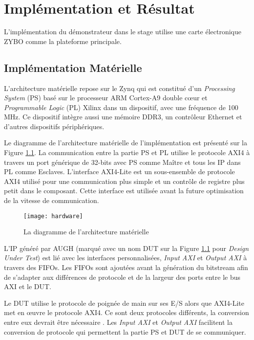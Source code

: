 \chapter{Implémentation et Résultat}

L'implémentation du démonstrateur dans le stage utilise une carte électronique ZYBO\cite{zyboweb}
comme la plateforme principale.

\section{Implémentation Matérielle}

L'architecture matérielle repose sur le Zynq qui est constitué d'un \emph{Processing System} (PS) 
basé sur le processeur ARM Cortex-A9 double cœur et \emph{Programmable Logic} (PL) Xilinx dans
un dispositif, avec une fréquence de 100 MHz. Ce dispositif intègre aussi une mémoire DDR3,
un contrôleur Ethernet et d'autres dispositifs périphériques.

Le diagramme de l'architecture matérielle de l'implémentation est présenté sur la Figure \ref{fig:hard}.
La communication entre la partie PS et PL utilise le protocole AXI4 à travers un port générique
de 32-bits avec PS comme Maître et tous les IP dans PL comme Esclaves.
L'interface AXI4-Lite est un sous-ensemble de protocole AXI4 utilisé pour une communication
plus simple et un contrôle de registre plus petit dans le composant. Cette interface est utilisée
avant la future optimisation de la vitesse de communication.

\begin{figure}[h]
	\label{fig:hard}
	\centering
	\texttt{[image: hardware]}
	\caption{La diagramme de l'architecture matérielle}
	\vspace{-2mm}
\end{figure}

L'IP généré par AUGH (marqué avec un nom DUT sur la Figure \ref{fig:hard} pour \emph{Design Under Test}) est lié avec les interfaces personnalisées,
\emph{Input AXI} et \emph{Output AXI} à travers des FIFOs. Les FIFOs sont ajoutées avant la génération du bitstream
afin de s'adapter aux différences de protocole et de la largeur des ports entre le bus AXI et le DUT.

Le DUT utilise le protocole de poignée de main sur ses E/S alors que AXI4-Lite met en œuvre le protocole AXI4.
Ce sont deux protocoles différents, la conversion entre eux devrait être nécessaire . Les \emph{Input AXI} et \emph{Output AXI}
facilitent la conversion de protocole qui permettent la partie PS et DUT de se communiquer. 

